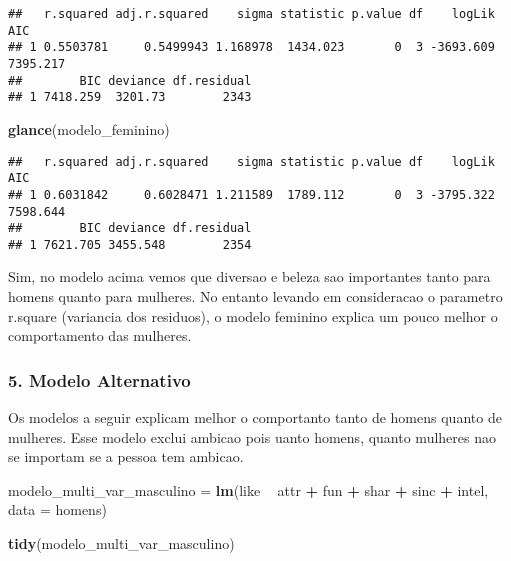 \documentclass[]{article}
\newenvironment{Shaded}{\begin{snugshade}}{\end{snugshade}}
\newcommand{\KeywordTok}[1]{\textcolor[rgb]{0.13,0.29,0.53}{\textbf{#1}}}
\newcommand{\DataTypeTok}[1]{\textcolor[rgb]{0.13,0.29,0.53}{#1}}
\newcommand{\StringTok}[1]{\textcolor[rgb]{0.31,0.60,0.02}{#1}}
\newcommand{\OperatorTok}[1]{\textcolor[rgb]{0.81,0.36,0.00}{\textbf{#1}}}
\newcommand{\NormalTok}[1]{#1}
\begin{document}
\begin{verbatim}
##   r.squared adj.r.squared    sigma statistic p.value df    logLik      AIC
## 1 0.5503781     0.5499943 1.168978  1434.023       0  3 -3693.609 7395.217
##        BIC deviance df.residual
## 1 7418.259  3201.73        2343
\end{verbatim}

\begin{Shaded}
\begin{Highlighting}[]
\KeywordTok{glance}\NormalTok{(modelo_feminino)}
\end{Highlighting}
\end{Shaded}

\begin{verbatim}
##   r.squared adj.r.squared    sigma statistic p.value df    logLik      AIC
## 1 0.6031842     0.6028471 1.211589  1789.112       0  3 -3795.322 7598.644
##        BIC deviance df.residual
## 1 7621.705 3455.548        2354
\end{verbatim}

Sim, no modelo acima vemos que diversao e beleza sao importantes tanto
para homens quanto para mulheres. No entanto levando em consideracao o
parametro r.square (variancia dos residuos), o modelo feminino explica
um pouco melhor o comportamento das mulheres.

\subsubsection{5. Modelo Alternativo}\label{modelo-alternativo}

Os modelos a seguir explicam melhor o comportanto tanto de homens quanto
de mulheres. Esse modelo exclui ambicao pois uanto homens, quanto
mulheres nao se importam se a pessoa tem ambicao.

\begin{Shaded}
\begin{Highlighting}[]
\NormalTok{modelo_multi_var_masculino =}\StringTok{ }\KeywordTok{lm}\NormalTok{(like }\OperatorTok{~}\StringTok{ }\NormalTok{attr }\OperatorTok{+}\StringTok{ }\NormalTok{fun }\OperatorTok{+}\StringTok{ }\NormalTok{shar }\OperatorTok{+}\StringTok{ }\NormalTok{sinc }\OperatorTok{+}\StringTok{ }\NormalTok{intel, }
               \DataTypeTok{data =}\NormalTok{ homens)}

\KeywordTok{tidy}\NormalTok{(modelo_multi_var_masculino)}
\end{Highlighting}
\end{Shaded}
\end{document}

